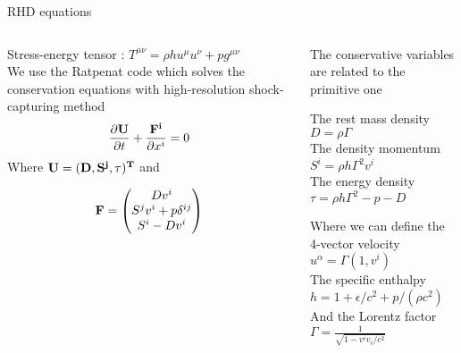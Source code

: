 \begin{frame}{RHD equations}
\begin{columns}
\begin{column}{0.5\textwidth}
Stress-energy tensor : $T^{\mu \nu} = \rho h u^{\mu} u^{\nu} + p g^{\mu\nu}$ \\
We use the Ratpenat code which solves the conservation equations with high-resolution shock-capturing method
{\small
\begin{align*}
 \frac{\partial \bf{U}}{\partial t} + \frac{\bf{F^{i}}}{\partial x^{i}} = 0
\end{align*}
}
Where $\bf{U}=(D,S^{j},\tau)^{T}$ and

\[
\bf{F} =
\begin{pmatrix}
  Dv^{i} \\
  S^{j}v^{i}+p\delta^{ij} \\
  S^{i}-Dv^{i} \\
\end{pmatrix}
\]

\end{column}
\begin{column}{0.5\textwidth}
The conservative variables are related to the primitive one \\
\begin{exampleblock}{}
The rest mass density $D = \rho \Gamma $ \\
The density momentum $S^{i} = \rho h \Gamma^{2} v^{i}$ \\
The energy density $\tau = \rho h\Gamma^{2} - p - D$ \\
\end{exampleblock}

Where we can define the 4-vector velocity $u^{\alpha} = \Gamma(1,v^{i})$ \\
The specific enthalpy $h=1+\epsilon/c^{2}+p/(\rho c^{2})$ \\
And the Lorentz factor $\Gamma = \frac{1}{\sqrt{1-v^{i}v_{i}/c^{2}}}$
\end{column}
\end{columns}
\end{frame}

